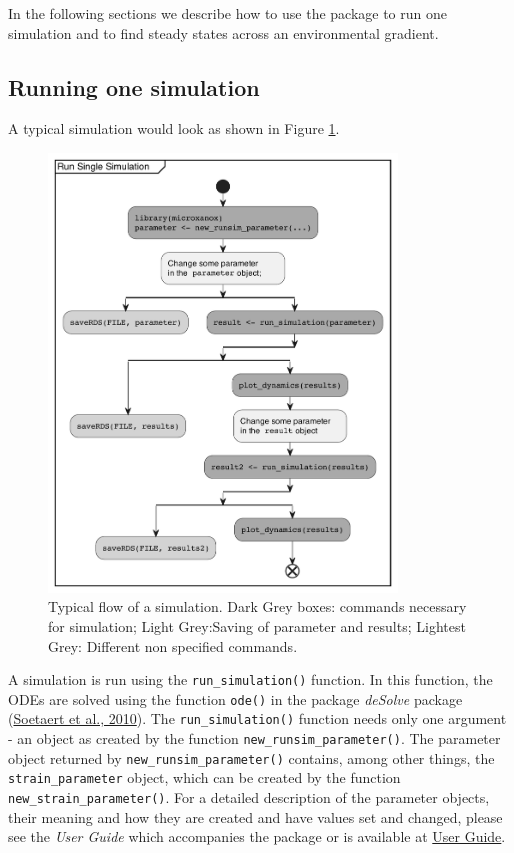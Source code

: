 \documentclass[
]{article}
\begin{document}
In the following sections we describe how to use the package to run one
simulation and to find steady states across an environmental gradient.

\hypertarget{running-one-simulation}{%
\subsection{Running one simulation}\label{running-one-simulation}}

A typical simulation would look as shown in Figure
\ref{fig:runsim_example}.

\begin{figure}

{\centering \includegraphics[width=350px]{./figures/simflow} 

}

\caption{Typical flow of a simulation. Dark Grey boxes: commands necessary for simulation; Light Grey:Saving of parameter and results; Lightest Grey: Different non specified commands.}\label{fig:runsim_example}
\end{figure}

A simulation is run using the \texttt{run\_simulation()} function. In
this function, the ODEs are solved using the function \texttt{ode()} in
the package \emph{deSolve} package
(\protect\hyperlink{ref-Soetaert2010}{Soetaert et al., 2010}). The
\texttt{run\_simulation()} function needs only one argument - an object
as created by the function \texttt{new\_runsim\_parameter()}. The
parameter object returned by \texttt{new\_runsim\_parameter()} contains,
among other things, the \texttt{strain\_parameter} object, which can be
created by the function \texttt{new\_strain\_parameter()}. For a
detailed description of the parameter objects, their meaning and how
they are created and have values set and changed, please see the
\emph{User Guide} which accompanies the package or is available at
\href{https://uzh-peg.r-universe.dev/articles/microxanox/User-guide.html}{User
Guide}.
\end{document}
